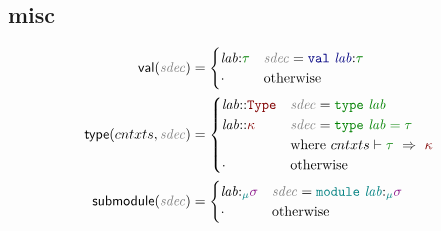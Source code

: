 \documentclass[10pt,fleqn]{article}
\newcommand{\red}[1]{\textcolor{red}{#1}}
\newcommand{\green}[1]{\textcolor{green}{#1}}
\newcommand{\blue}[1]{\textcolor{blue}{#1}}
\newcommand{\purple}[1]{\textcolor{purple}{#1}}
\newcommand{\teal}[1]{\textcolor{teal}{#1}}
\newcommand{\black}[1]{\textcolor{black}{#1}}
\newcommand{\grey}[1]{\textcolor{grey}{#1}}
\newcommand{\redtt}[1]{\red{\mathtt{#1}}}
\newcommand{\greentt}[1]{\green{\mathtt{#1}}}
\newcommand{\bluett}[1]{\blue{\mathtt{#1}}}
\newcommand{\tealtt}[1]{\teal{\mathtt{#1}}}
\newcommand{\redit}[1]{\red{\mathit{#1}}}
\newcommand{\greenit}[1]{\green{\mathit{#1}}}
\newcommand{\purpleit}[1]{\purple{\mathit{#1}}}
\newcommand{\tealit}[1]{\teal{\mathit{#1}}}
\newcommand{\greyit}[1]{\grey{\mathit{#1}}}
\newcommand{\knd}[1][]{\redit{\kappa#1}}
\newcommand{\typ}[1][]{\greenit{\tau#1}}
\newcommand{\sig}[1][]{\purpleit{\sigma#1}}
\renewcommand{\mod}[1][]{\tealit{\mu#1}}
\newcommand{\lab}[1][]{\mathit{lab#1}}
\newcommand{\Type}{\redtt{Type}}
\newcommand{\sdec}[1][]{\greyit{sdec#1}}
\newcommand{\OpaqueTypeSdec}[1]{\greentt{type~#1}}
\newcommand{\TransparentTypeSdec}[2]{\greentt{type~#1 = #2}}
\newcommand{\ValSdec}[2]{\bluett{val~#1\TypAnn #2}}
\newcommand{\ModSdec}[2]{\tealtt{module~#1\SigAnn #2}}
\newcommand{\val}[1]{\mathsf{val(}#1\mathsf{)}}
\newcommand*{\type}[2]{\mathsf{type(}#1, #2\mathsf{)}}
\newcommand{\submodule}[1]{\mathsf{submodule(}#1\mathsf{)}}
\newcommand{\TypAssump}{\black{:}}
\newcommand{\TypAnn}{\black{:}}
\newcommand{\KndAssump}{\black{::}}
\newcommand{\SigAssump}{\black{:_{\mod}}}
\newcommand{\SigAnn}{\black{:_{\mod}}}
\newcommand{\Syn}[3]{#1 \vdash #2~\Rightarrow~#3}
\begin{document}
\subsection*{misc}
\begin{align*}
    \val{\sdec} &=
    \begin{cases}
        \lab\TypAssump\typ & \sdec = \ValSdec{\lab}{\typ} \\
        \cdot & \textrm{otherwise} \\
    \end{cases} \\
    \type{cntxts}{\sdec} &=
    \begin{cases}
        \lab\KndAssump\Type & \sdec = \OpaqueTypeSdec{\lab} \\
        \lab\KndAssump\knd & \sdec = \TransparentTypeSdec{\lab}{\typ} \\
                           & \textrm{where}~\Syn{cntxts}{\typ}{\knd}\\
        \cdot & \textrm{otherwise} \\
    \end{cases} \\
    \submodule{\sdec} &=
    \begin{cases}
        \lab\SigAssump\sig & \sdec = \ModSdec{\lab}{\sig} \\
        \cdot & \textrm{otherwise} \\
    \end{cases} \\
\end{align*}
\end{document}
